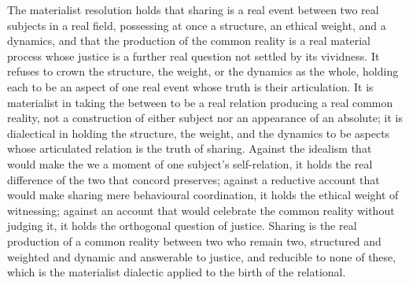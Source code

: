 The materialist resolution holds that sharing is a real event between two real subjects in a real field, possessing at once a structure, an ethical weight, and a dynamics, and that the production of the common reality is a real material process whose justice is a further real question not settled by its vividness. It refuses to crown the structure, the weight, or the dynamics as the whole, holding each to be an aspect of one real event whose truth is their articulation. It is materialist in taking the between to be a real relation producing a real common reality, not a construction of either subject nor an appearance of an absolute; it is dialectical in holding the structure, the weight, and the dynamics to be aspects whose articulated relation is the truth of sharing. Against the idealism that would make the we a moment of one subject's self-relation, it holds the real difference of the two that concord preserves; against a reductive account that would make sharing mere behavioural coordination, it holds the ethical weight of witnessing; against an account that would celebrate the common reality without judging it, it holds the orthogonal question of justice. Sharing is the real production of a common reality between two who remain two, structured and weighted and dynamic and answerable to justice, and reducible to none of these, which is the materialist dialectic applied to the birth of the relational.
